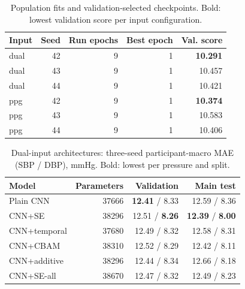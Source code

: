 \documentclass[conference]{IEEEtran}
\begin{document}
\begin{table}[t]
\centering\caption{Population fits and validation-selected checkpoints. Bold: lowest validation score per input configuration.}\label{tab:epochs}
\scriptsize
\setlength{\tabcolsep}{4pt}
\begin{tabular}{lrrrr}\toprule
Input & Seed & Run epochs & Best epoch & Val. score\\\midrule
dual & 42 & 9 & 1 & \textbf{10.291}\\
dual & 43 & 9 & 1 & 10.457\\
dual & 44 & 9 & 1 & 10.421\\
ppg & 42 & 9 & 1 & \textbf{10.374}\\
ppg & 43 & 9 & 1 & 10.583\\
ppg & 44 & 9 & 1 & 10.406\\
\bottomrule\end{tabular}
\end{table}

\begin{table}[t]
\centering\caption{Dual-input architectures: three-seed participant-macro MAE (SBP / DBP), mmHg. Bold: lowest per pressure and split.}\label{tab:architecture}
\scriptsize
\setlength{\tabcolsep}{4pt}
\begin{tabular}{lrrr}\toprule
Model & Parameters & Validation & Main test\\\midrule
Plain CNN & 37666 & \textbf{12.41} / 8.33 & 12.59 / 8.36\\
CNN+SE & 38296 & 12.51 / \textbf{8.26} & \textbf{12.39} / \textbf{8.00}\\
CNN+temporal & 37680 & 12.49 / 8.32 & 12.58 / 8.31\\
CNN+CBAM & 38310 & 12.52 / 8.29 & 12.42 / 8.11\\
CNN+additive & 38296 & 12.44 / 8.34 & 12.66 / 8.18\\
CNN+SE-all & 38670 & 12.47 / 8.32 & 12.49 / 8.23\\
\bottomrule\end{tabular}
\end{table}
\end{document}
